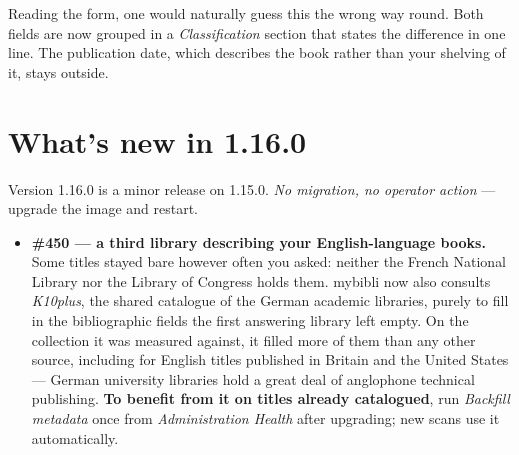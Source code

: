 \begin{itemize}
        Reading the form, one would naturally guess this the wrong way
        round. Both fields are now grouped in a \emph{Classification}
        section that states the difference in one line. The publication
        date, which describes the book rather than your shelving of it,
        stays outside.
\end{itemize}

\section{What's new in 1.16.0}\label{sec:whats-new-1.16.0}

Version 1.16.0 is a minor release on 1.15.0. \emph{No migration, no
operator action} \string— upgrade the image and restart.

\begin{itemize}
  \item \textbf{\#450 \string— a third library describing your
        English-language books.} Some titles stayed bare however often
        you asked: neither the French National Library nor the Library
        of Congress holds them. mybibli now also consults
        \emph{K10plus}, the shared catalogue of the German academic
        libraries, purely to fill in the bibliographic fields the
        first answering library left empty. On the collection it was
        measured against, it filled more of them than any other
        source, including for English titles published in Britain and
        the United States \string— German university libraries hold a
        great deal of anglophone technical publishing. \textbf{To
        benefit from it on titles already catalogued}, run
        \emph{Backfill metadata} once from
        \emph{Administration \textrightarrow{} Health} after
        upgrading; new scans use it automatically.


\end{itemize}
